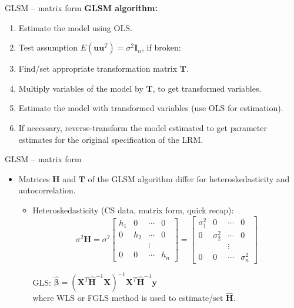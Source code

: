 \documentclass{beamer}
\begin{document}
\begin{frame}{GLSM – matrix form}
\textbf{GLSM algorithm:}
\begin{enumerate}
\item Estimate the model using OLS.
\item Test assumption $E(\boldsymbol{uu}^T)=\sigma^2 \boldsymbol{I}_n$, if  broken:
\item Find/set appropriate transformation matrix $\boldsymbol{T}$.
\item Multiply variables of the model by $\boldsymbol{T}$, to get transformed variables.
\item Estimate the model with transformed variables (use OLS for estimation).
\item If necessary, reverse-transform the model estimated to get parameter estimates for the original specification of the LRM.
\end{enumerate}
\end{frame}


\begin{frame}{GLSM – matrix form}
\begin{itemize}
\item Matrices $\boldsymbol{H}$ and $\boldsymbol{T}$ of the GLSM algorithm differ for heteroskedasticity  and autocorrelation.
\vspace{0.2cm}
\begin{itemize}

\item Heteroskedasticity (CS data, matrix form, quick recap):\\
$$\sigma^2 \bm{H} = \sigma^2 
\begin{bmatrix}
    h_1&  0 & \cdots & 0\\
    0 &  h_2&  \cdots & 0\\ 
     &    &  \vdots& \\ 
     0 & 0 & \cdots & h_n 
\end{bmatrix} = 
\begin{bmatrix}
    \sigma^2_1&  0 & \cdots & 0\\
    0 &  \sigma^2_2&  \cdots & 0\\ 
     &    &  \vdots& \\ 
     0 & 0 & \cdots & \sigma^2_n 
\end{bmatrix}
$$

GLS: $\bm{\hat{\beta}}=(\bm{X}^T \bm{\hat{H}}^{-1} \bm{X})^{-1} \bm{X}^T \bm{\hat{H}}^{-1} \bm{y}$\\
where WLS or FGLS method is used to estimate/set $\bm{\hat{H}}$.
\end{itemize}
\end{itemize}


\end{frame}
\end{document}
